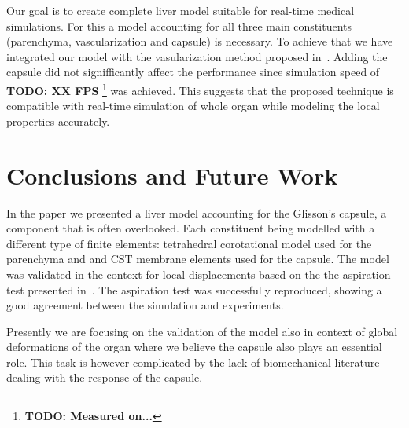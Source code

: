 \documentclass{acm_proc_article-sp}
\newcommand{\TG}[1]{{\color{blue}\textbf{TG: #1}}}
\newcommand{\TODO}[1]{{\color{red}\textbf{TODO: #1}}}
\begin{document}

Our goal is to create complete liver model suitable for real-time medical
simulations. For this a model accounting for all three main constituents
(parenchyma, vascularization and capsule) is necessary. To achieve that we have
integrated our model with the vasularization method proposed
in~\cite{Peterlik2012}. Adding the capsule did not signifficantly affect the
performance since simulation speed of \TODO{XX FPS}%
\footnote{\TODO{Measured on...}} was achieved. This suggests
that the proposed technique is compatible with real-time simulation of whole
organ while modeling the local properties accurately.



\section{Conclusions and Future Work} %

In the paper we presented a liver model accounting for the Glisson's capsule, a component that is often overlooked. Each constituent being modelled with a different type 
of finite elements: tetrahedral corotational model used for the parenchyma and
and CST membrane elements used for the capsule. 
The model was validated in the context for local displacements based on the the aspiration test presented in~\cite{Hollenstein2006}. The aspiration test
was successfully reproduced, showing a good agreement between the simulation and experiments. 

Presently we are focusing on the validation of the model also in context of
global deformations of the organ where we believe the capsule also plays an
essential role. This task is however complicated by the lack of biomechanical
literature dealing with the response of the capsule.




%
%



\end{document}
